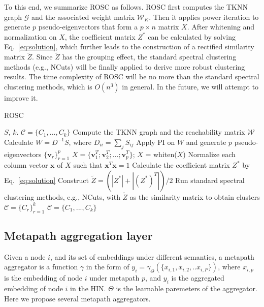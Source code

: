 {To this end, we summarize ROSC as follows.
ROSC first computes the TKNN graph $\mathcal{G}$
and the associated weight matrix $\mathcal{W}_K$. Then it applies power iteration to generate $p$
pseudo-eigenvectors that form a $p \times n$ matrix $X$.
After whitening and normalization on $X$,
the coefficient matrix $Z^*$ can be calculated by solving Eq.~\ref{eq:solution},
which further leads to the construction of a rectified similarity matrix $\tilde{Z}$.
Since $\tilde{Z}$ has the grouping effect, 
the standard spectral clustering methods (e.g., NCuts) will be finally applied to derive more robust clustering results.
The time complexity of ROSC will be no more than the standard spectral clustering methods,
which is $O(n^3)$ in general.
In the future, we will attempt to improve it. 
}

\begin{algorithm}
\begin{small}
\caption{ROSC}
\label{alg}
\begin{algorithmic}[1]
\Require $S$, $k$.
\Ensure $\mathcal{C} = \{C_1, ..., C_k\}$
\State Compute the TKNN graph and the reachability matrix $\mathcal{W}$
\State Calculate $W = D^{-1}S$, where $D_{ii} = \sum_jS_{ij}$
\State Apply PI on $W$ and generate $p$ pseudo-eigenvectors $\{\bm{v}_r\}_{r=1}^p$
\State $X = \{\bm{v}_1^T; \bm{v}_2^T; ...; \bm{v}_p^T\}$; $X$ = whiten($X$)
\State Normalize each column vector $\bm{x}$ of $X$ such that $\bm{x}^T\bm{x} = 1$
\State Calculate the coefficient matrix $Z^*$ by Eq.~\ref{eq:solution}
\State Construct $\tilde{Z} = (|Z^*| + |(Z^*)^T|)/2$
\State Run standard spectral clustering methods, e.g., NCuts, with $\tilde{Z}$ as the
similarity matrix to obtain clusters $\mathcal{C} = \{C_r\}_{r=1}^k$
\State \Return $\mathcal{C} = \{C_1, ..., C_k\}$
\end{algorithmic}
\end{small}
\end{algorithm}




\subsection{Metapath aggregation layer}
Given a node $i$, and its set of embeddings under different semantics, a metapath aggregator is a function $\gamma$ in the form of $y_i = \gamma_\Theta(\{x_{i,1},x_{i,2},..x_{i,P}\})$, where $x_{i,p}$ is the embedding of node $i$ under metapath $p$, and $y_i$ is the aggregated embedding of node $i$ in the HIN. $\Theta$ is the learnable paremeters of the aggregator.
Here we propose several metapath aggregators. 

